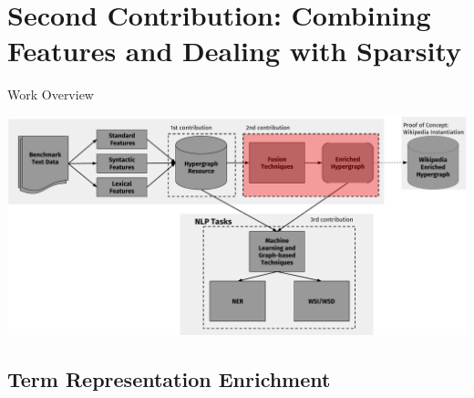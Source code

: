 \documentclass[10pt,xcolor=table]{beamer}
\begin{document}


\section{Second \bfseries{Contribution}: Combining Features and Dealing with Sparsity}

\begin{frame}{Work Overview}
\begin{center}
\includegraphics[width=1.04\linewidth]{image2/Chapitre3/main_diag_presi_contri2.pdf}
\end{center}

 \vspace{\textheight}
\end{frame} 
\subsection{Term Representation Enrichment}
\end{document}
